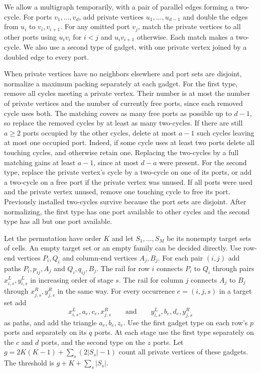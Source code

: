 \documentclass[11pt]{article}
\begin{document}
We allow a multigraph temporarily, with a pair of parallel edges
forming a two-cycle. For ports \(v_1,\ldots,v_d\), add private vertices
\(u_1,\ldots,u_{d-1}\) and double the edges from \(u_i\) to \(v_i,v_{i+1}\).
For any omitted port \(v_j\), match the private vertices to all other
ports using \(u_i v_i\) for \(i<j\) and \(u_i v_{i+1}\) otherwise.
Each match makes a two-cycle. We also use a second type of gadget,
with one private vertex joined by a doubled edge to every port.

When private vertices have no neighbors elsewhere and port sets are
disjoint, normalize a maximum packing separately at each gadget.
For the first type, remove all cycles meeting a private vertex.
Their number is at most the number of private vertices and the number
of currently free ports, since each removed cycle uses both.
The matching covers as many free ports as possible up to \(d-1\),
so replace the removed cycles by at least as many two-cycles.
If there are still \(a\ge2\) ports occupied by the other cycles,
delete at most \(a-1\) such cycles leaving at most one occupied port.
Indeed, if some cycle uses at least two ports delete all touching
cycles, and otherwise retain one. Replacing the two-cycles by a
full matching gains at least \(a-1\), since at most \(d-a\)
were present. For the second type, replace the private vertex's
cycle by a two-cycle on one of its ports, or add a two-cycle on a
free port if the private vertex was unused. If all ports were
used and the private vertex unused, remove one touching cycle
to free its port. Previously installed two-cycles survive because
the port sets are disjoint. After normalizing, the first type
has one port available to other cycles and the second type has
all but one port available.

Let the permutation have order \(K\) and let \(S_1,\ldots,S_M\)
be its nonempty target sets of cells. An empty target set or an
empty family can be decided directly. Use row-end vertices \(P_i,Q_i\)
and column-end vertices \(A_j,B_j\). For each pair \((i,j)\) add
paths \(P_i,p_{ij},A_j\) and \(Q_i,q_{ij},B_j\).
The rail for row \(i\) connects \(P_i\) to \(Q_i\) through pairs
\(x^L_{i,s},y^L_{i,s}\) in increasing order of stage \(s\).
The rail for column \(j\) connects \(A_j\) to \(B_j\) through
\(x^R_{j,s},y^R_{j,s}\) in the same way. For every occurrence
\(e=(i,j,s)\) in a target set add
\[
 x^L_{i,s},a_e,c_e,x^R_{j,s}\qquad\text{and}\qquad
 y^L_{i,s},b_e,d_e,y^R_{j,s}
\]
as paths, and add the triangle \(a_e,b_e,z_e\).
Use the first gadget type on each row's \(p\) ports and separately
on its \(q\) ports. At each stage use the first type separately
on the \(c\) and \(d\) ports, and the second type on the \(z\) ports.
Let \(g=2K(K-1)+\sum_s(2|S_s|-1)\) count all private vertices
of these gadgets. The threshold is \(g+K+\sum_s|S_s|\).
\end{document}
